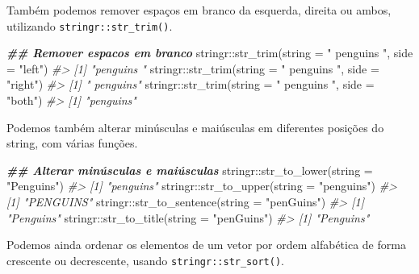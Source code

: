 \documentclass[
]{book}
\newenvironment{Shaded}{\begin{snugshade}}{\end{snugshade}}
\newcommand{\AttributeTok}[1]{\textcolor[rgb]{0.61,0.61,0.61}{#1}}
\newcommand{\CommentTok}[1]{\textcolor[rgb]{0.37,0.37,0.37}{\textit{#1}}}
\newcommand{\DocumentationTok}[1]{\textcolor[rgb]{0.37,0.37,0.37}{\textbf{\textit{#1}}}}
\newcommand{\FunctionTok}[1]{\textcolor[rgb]{0,0,0}{#1}}
\newcommand{\NormalTok}[1]{#1}
\newcommand{\SpecialCharTok}[1]{\textcolor[rgb]{0,0,0}{#1}}
\newcommand{\StringTok}[1]{\textcolor[rgb]{0.5,0.5,0.5}{#1}}
\begin{document}
Também podemos remover espaços em branco da esquerda, direita ou ambos, utilizando \texttt{stringr::str\_trim()}.

\begin{Shaded}
\begin{Highlighting}[]
\DocumentationTok{\#\# Remover espacos em branco}
\NormalTok{stringr}\SpecialCharTok{::}\FunctionTok{str\_trim}\NormalTok{(}\AttributeTok{string =} \StringTok{" penguins "}\NormalTok{, }\AttributeTok{side =} \StringTok{"left"}\NormalTok{)}
\CommentTok{\#\textgreater{} [1] "penguins "}
\NormalTok{stringr}\SpecialCharTok{::}\FunctionTok{str\_trim}\NormalTok{(}\AttributeTok{string =} \StringTok{" penguins "}\NormalTok{, }\AttributeTok{side =} \StringTok{"right"}\NormalTok{)}
\CommentTok{\#\textgreater{} [1] " penguins"}
\NormalTok{stringr}\SpecialCharTok{::}\FunctionTok{str\_trim}\NormalTok{(}\AttributeTok{string =} \StringTok{" penguins "}\NormalTok{, }\AttributeTok{side =} \StringTok{"both"}\NormalTok{)}
\CommentTok{\#\textgreater{} [1] "penguins"}
\end{Highlighting}
\end{Shaded}

Podemos também alterar minúsculas e maiúsculas em diferentes posições do string, com várias funções.

\begin{Shaded}
\begin{Highlighting}[]
\DocumentationTok{\#\# Alterar minúsculas e maiúsculas}
\NormalTok{stringr}\SpecialCharTok{::}\FunctionTok{str\_to\_lower}\NormalTok{(}\AttributeTok{string =} \StringTok{"Penguins"}\NormalTok{)}
\CommentTok{\#\textgreater{} [1] "penguins"}
\NormalTok{stringr}\SpecialCharTok{::}\FunctionTok{str\_to\_upper}\NormalTok{(}\AttributeTok{string =} \StringTok{"penguins"}\NormalTok{)}
\CommentTok{\#\textgreater{} [1] "PENGUINS"}
\NormalTok{stringr}\SpecialCharTok{::}\FunctionTok{str\_to\_sentence}\NormalTok{(}\AttributeTok{string =} \StringTok{"penGuins"}\NormalTok{)}
\CommentTok{\#\textgreater{} [1] "Penguins"}
\NormalTok{stringr}\SpecialCharTok{::}\FunctionTok{str\_to\_title}\NormalTok{(}\AttributeTok{string =} \StringTok{"penGuins"}\NormalTok{)}
\CommentTok{\#\textgreater{} [1] "Penguins"}
\end{Highlighting}
\end{Shaded}

Podemos ainda ordenar os elementos de um vetor por ordem alfabética de forma crescente ou decrescente, usando \texttt{stringr::str\_sort()}.
\end{document}
